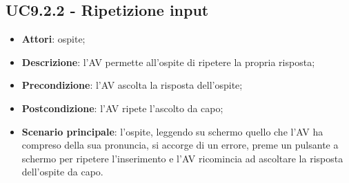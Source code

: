 \documentclass[../AnalisiDeiRequisiti.tex]{subfiles}
\begin{document}
\subsection{UC9.2.2 - Ripetizione input} 
\label{sssec:UC9.2.2} 
\begin{itemize} 
\item \textbf{Attori}: ospite;
\item \textbf{Descrizione}: l'AV permette all'ospite di ripetere la propria risposta;
\item \textbf{Precondizione}: l'AV ascolta la risposta dell'ospite;
\item \textbf{Postcondizione}: l'AV ripete l'ascolto da capo;
\item \textbf{Scenario principale}: l'ospite, leggendo su schermo quello che l'AV ha compreso della sua pronuncia, si accorge di un errore, preme un pulsante a schermo per ripetere l'inserimento e l'AV ricomincia ad ascoltare la risposta dell'ospite da capo.\end{itemize} 
\end{document}

